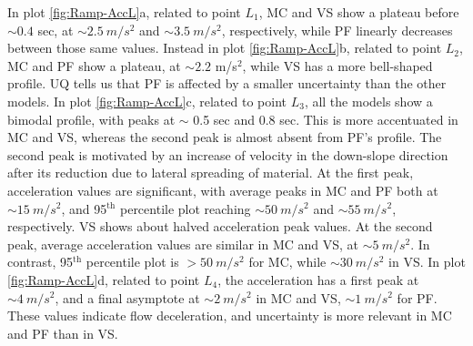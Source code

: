 \documentclass{article}
\begin{document}
In plot \ref{fig:Ramp-AccL}a, related to point $L_1$, MC and VS show a plateau before $\sim 0.4$ sec, at $\sim 2.5 \ m/s^2$ and $\sim 3.5 \ m/s^2$, respectively, while PF linearly decreases between those same values. Instead in plot \ref{fig:Ramp-AccL}b, related to point $L_2$, MC and PF show a plateau, at $\sim 2.2$ m/s$^2$, while VS has a more bell-shaped profile. UQ tells us that PF is affected by a smaller uncertainty than the other models. In plot \ref{fig:Ramp-AccL}c, related to point $L_3$, all the models show a bimodal profile, with peaks at $\sim$ 0.5 sec and 0.8 sec. This is more accentuated in MC and VS, whereas the second peak is almost absent from PF's profile. The second peak is motivated by an increase of velocity in the down-slope direction after its reduction due to lateral spreading of material. At the first peak, acceleration values are significant, with average peaks in MC and PF both at $\sim 15 \ m/s^2$, and 95$^{\mathrm{th}}$ percentile plot reaching $\sim 50 \ m/s^2$ and $\sim 55 \ m/s^2$, respectively. VS shows about halved acceleration peak values. At the second peak, average acceleration values are similar in MC and VS, at $\sim 5 \ m/s^2$. In contrast, 95$^{\mathrm{th}}$ percentile plot is $> 50 \ m/s^2$ for MC, while $\sim 30 \ m/s^2$ in VS. In plot \ref{fig:Ramp-AccL}d, related to point $L_4$, the acceleration has a first peak at $\sim 4 \ m/s^2$, and a final asymptote at $\sim 2 \ m/s^2$ in MC and VS, $\sim 1 \ m/s^2$ for PF. These values indicate flow deceleration, and uncertainty is more relevant in MC and PF than in VS.
\newpage
\end{document}
